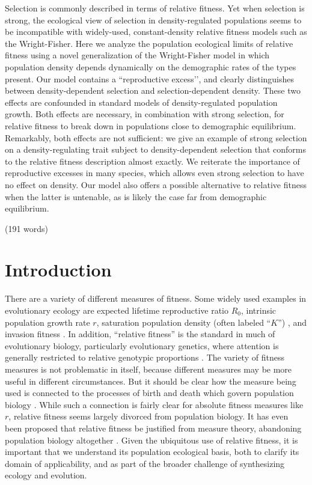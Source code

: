 \documentclass[12pt]{article}
\begin{document}
Selection is commonly described in terms of relative fitness. Yet when selection is strong, the ecological view of selection in density-regulated populations seems to be incompatible with widely-used, constant-density relative fitness models such as the Wright-Fisher. Here we analyze the population ecological limits of relative fitness using a novel generalization of the Wright-Fisher model in which population density depends dynamically on the demographic rates of the types present. Our model contains a ``reproductive excess’’, and clearly distinguishes between density-dependent selection and selection-dependent density. These two effects are confounded in standard models of density-regulated population growth. Both effects are necessary, in combination with strong selection, for relative fitness to break down in populations close to demographic equilibrium. Remarkably, both effects are not sufficient: we give an example of strong selection on a density-regulating trait subject to density-dependent selection that conforms to the relative fitness description almost exactly. We reiterate the importance of reproductive excesses in many species, which allows even strong selection to have no effect on density. Our model also offers a possible alternative to relative fitness when the latter is untenable, as is likely the case far from demographic equilibrium. 

\noindent (191 words)



\newpage{}


\section*{Introduction}

There are a variety of different measures of fitness. Some widely used examples in evolutionary ecology are expected lifetime reproductive ratio $R_0$, intrinsic population growth rate $r$, saturation population density (often labeled ``$K$'') \citep{benton_2000}, and invasion fitness \citep{metz_1992}. In addition, ``relative fitness'' is the standard in much of evolutionary biology, particularly evolutionary genetics, where attention is generally restricted to relative genotypic proportions \cite[pp. 468]{barton_2007}. The variety of fitness measures is not problematic in itself, because different measures may be more useful in different circumstances. But it should be clear how the measure being used is connected to the processes of birth and death which govern population biology \citep{metcalf_2007,doebeli_2017}. While such a connection is fairly clear for absolute fitness measures like $r$, relative fitness seems largely divorced from population biology. It has even been proposed that relative fitness be justified from measure theory, abandoning population biology altogether \citep{wagner_2010}. Given the ubiquitous use of relative fitness, it is important that we understand its population ecological basis, both to clarify its domain of applicability, and as part of the broader challenge of synthesizing ecology and evolution.
\end{document}
